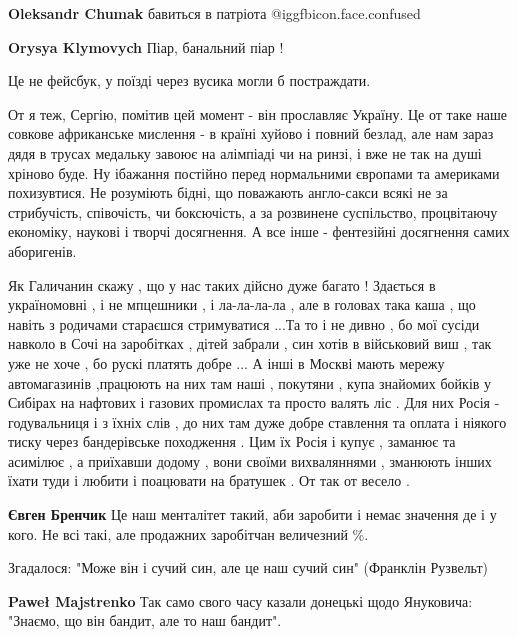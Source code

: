 \begin{itemize}
\begin{itemize}
\textbf{Oleksandr Chumak}
бавиться в патріота  @igg{fbicon.face.confused} 

\textbf{Orysya Klymovych} Піар, банальний піар !
\end{itemize} %

Це не фейсбук, у поїзді через вусика могли б постраждати.


От я теж, Сергію, помітив цей момент - він прославляє Україну. Це от таке наше
совкове африканське мислення - в країні хуйово і повний безлад, але нам зараз
дядя в трусах медальку завоює на алімпіаді чи на ринзі, і вже не так на душі
хріново буде. Ну ібажання постійно перед нормальними європами та америками
похизувтися. Не розуміють бідні, що поважають англо-сакси всякі не за
стрибучість, співочість, чи боксючість, а за розвинене суспільство, процвітаючу
економіку, наукові і творчі досягнення. А все інше - фентезійні досягнення
самих аборигенів.


Як Галичанин скажу , що у нас таких дійсно дуже багато ! Здається в
україномовні , і не мпцешники , і ла-ла-ла-ла , але в головах така каша , що
навіть з родичами стараєшся стримуватися ...Та то і не дивно , бо мої сусіди
навколо в Сочі на заробітках , дітей забрали , син хотів в військовий виш , так
уже не хоче , бо рускі платять добре ... А інші в Москві мають мережу
автомагазинів ,працюють на них там наші , покутяни , купа знайомих бойків у
Сибірах на нафтових і газових промислах та просто валять ліс . Для них Росія -
годувальниця і з їхніх слів , до них там дуже добре ставлення та оплата і
ніякого тиску через бандерівське походження . Цим їх Росія і купує , заманює та
асимілює , а приїхавши додому , вони своїми вихваляннями , зманюють інших їхати
туди і любити і поацювати на братушек . От так от весело .

\begin{itemize} %
\textbf{Євген Бренчик}
Це наш менталітет такий, аби заробити і немає значення де і у кого.
Не всі такі, але продажних заробітчан величезний \%.
\end{itemize} %


Згадалося: "Може він і сучий син, але це наш сучий син" (Франклін Рузвельт)

\begin{itemize} %
\textbf{Paweł Majstrenko}
Так само свого часу казали донецькі щодо Януковича: "Знаємо, що він бандит, але то наш бандит".


\end{itemize}
\end{itemize}
